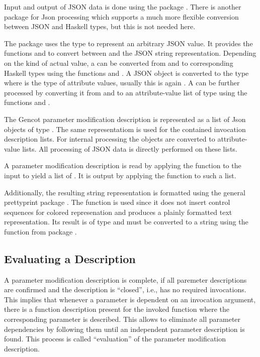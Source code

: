 Input and output of JSON data is done using the package . There is another package  for
Json processing which supports a much more flexible conversion between JSON and Haskell types, but this is not
needed here.

The package  uses the type  to represent an arbitrary JSON value. It provides the functions
 and  to convert between  and the JSON string representation. Depending
on the kind of actual value, a  can be converted from and to corresponding Haskell types using
the functions  and . A JSON object is converted to the type  where
 is the type of attribute values, usually this is again . A  can be further
processed by converting it from and to an attribute-value list of type \code{[(String,a)]} using the functions
 and .

The Gencot parameter modification description is represented as a list of Json objects of type .
The same representatiom is used for the contained invocation description lists. For internal processing the objects
are converted to attribute-value lists. All processing of JSON data is directly performed on these lists.

A parameter modification description is read by applying the  function to the input to yield a
list of . It is output by applying the  function to such a list. 

Additionally,
the resulting string representation is formatted using the general prettyprint package .
The function  is used since it does not insert control sequences for colored represenation
and produces a plainly formatted text representation. Its result is of type  and must be converted to a
string using the function  from package .

\subsection{Evaluating a Description}
\label{impl-parmod-eval}

A parameter modification description is complete, if all paremeter descriptions are confirmed and the description 
is ``closed'', i.e., has no required invocations. This implies that whenever a parameter is dependent on an invocation argument,
there is a function description present for the invoked function where the corresponding parameter is described.
This allows to eliminate all parameter dependencies by following them until an independent parameter description is found.
This process is called ``evaluation'' of the parameter modification description.

